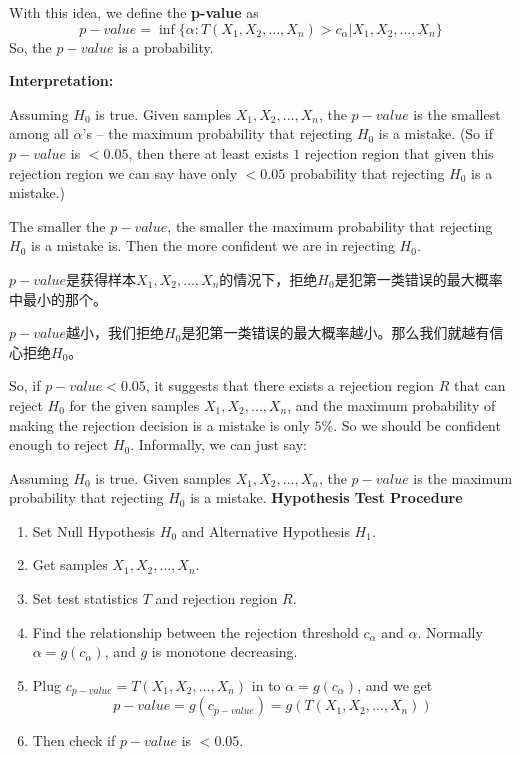 \documentclass[13pt]{article}
\theoremstyle{definition}
\theoremstyle{remark}
\newenvironment{remark}
  {\pushQED{\qed}\renewcommand{\qedsymbol}{$\triangle$}\remarkx}
  {\popQED\endremarkx}
\begin{document}
With this idea, we define the \textbf{p-value} as
\[
p-value = \inf\{\alpha: T(X_1, X_2, \ldots, X_n)>c_{\alpha}|X_1, X_2, \ldots, X_n\}
\]
{\color{C3} So, the $p-value$ is a probability.}

\textbf{Interpretation:}

Assuming $H_0$ is true. Given samples $X_1, X_2, \ldots, X_n$, the $p-value$ is the smallest among all $\alpha$'s -- the maximum probability that rejecting $H_0$ is a mistake. (So if $p-value$ is $<0.05$, then there at least exists $1$ rejection region that given this rejection region we can say have only $<0.05$ probability that rejecting $H_0$ is a mistake.)

The smaller the $p-value$, the smaller the maximum probability that rejecting $H_0$ is a mistake is. Then the more confident we are in rejecting $H_0$.

$p-value$是获得样本$X_1, X_2, \ldots, X_n$的情况下，拒绝$H_0$是犯第一类错误的最大概率中最小的那个。

$p-value$越小，我们拒绝$H_0$是犯第一类错误的最大概率越小。那么我们就越有信心拒绝$H_0$。

So, if $p-value<0.05$, it suggests that there exists a rejection region $R$ that can reject $H_0$ for the given samples $X_1, X_2, \ldots, X_n$, and the maximum probability of making the rejection decision is a mistake is only $5\%$. So we should be confident enough to reject $H_0$.
\begin{remark}
    Informally, we can just say:

    Assuming $H_0$ is true. Given samples $X_1, X_2, \ldots, X_n$, the $p-value$ is the maximum probability that rejecting $H_0$ is a mistake.
\end{remark}
\textbf{Hypothesis Test Procedure}

\begin{enumerate}
    \item Set Null Hypothesis $H_0$ and Alternative Hypothesis $H_1$.
    \item Get samples $X_1, X_2, \ldots, X_n$.
    \item Set test statistics $T$ and rejection region $R$.
    \item Find the relationship between the rejection threshold $c_{\alpha}$ and $\alpha$. Normally $\alpha = g(c_{\alpha})$, and $g$ is monotone decreasing.
    \item Plug $c_{p-value} = T(X_1, X_2, \ldots, X_n)$ in to $\alpha = g(c_{\alpha})$, and we get
    \[
    p-value=g(c_{p-value})=g(T(X_1, X_2, \ldots, X_n))
    \]
    \item Then check if $p-value$ is $<0.05$.
\end{enumerate}
\end{document}

